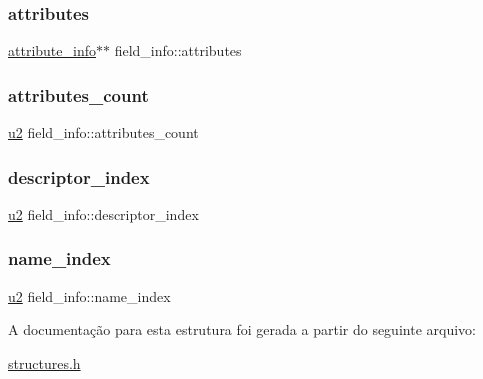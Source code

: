 \mbox{\label{structfield__info_a754de0f0fd6e62c413cca2979ca5debd}} 
\subsubsection{\texorpdfstring{attributes}{attributes}}
{\footnotesize\ttfamily \hyperlink{structattribute__info}{attribute\+\_\+info}$\ast$$\ast$ field\+\_\+info\+::attributes}

\mbox{\label{structfield__info_a83bfa4ff84a608e3dbd1c3968ebe1b80}} 
\subsubsection{\texorpdfstring{attributes\+\_\+count}{attributes\_count}}
{\footnotesize\ttfamily \hyperlink{lista__operandos_8h_a732cde1300aafb73b0ea6c2558a7a54f}{u2} field\+\_\+info\+::attributes\+\_\+count}

\mbox{\label{structfield__info_a12dd492b7fb1d61da1ac14938d97b07f}} 
\subsubsection{\texorpdfstring{descriptor\+\_\+index}{descriptor\_index}}
{\footnotesize\ttfamily \hyperlink{lista__operandos_8h_a732cde1300aafb73b0ea6c2558a7a54f}{u2} field\+\_\+info\+::descriptor\+\_\+index}

\mbox{\label{structfield__info_a425e3ae85badd81c67ef00acca85ad9e}} 
\subsubsection{\texorpdfstring{name\+\_\+index}{name\_index}}
{\footnotesize\ttfamily \hyperlink{lista__operandos_8h_a732cde1300aafb73b0ea6c2558a7a54f}{u2} field\+\_\+info\+::name\+\_\+index}



A documentação para esta estrutura foi gerada a partir do seguinte arquivo\+:\begin{DoxyCompactItemize}
\item 
\hyperlink{structures_8h}{structures.\+h}\end{DoxyCompactItemize}
